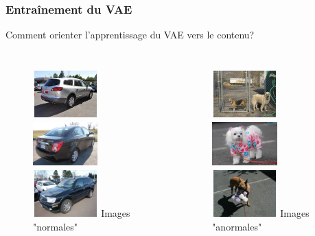 \documentclass{beamer}
\begin{document}
	\begin{frame}
		\frametitle{Entraînement du VAE}
		
		Comment orienter l'apprentissage du VAE vers le contenu?
		
		\begin{columns}
			\centering
			\begin{figure}
				\includegraphics[width=2.5cm,height=1.8cm]{../rapports/images/images_anomalies/inlier-1}
				\includegraphics[width=2.5cm,height=1.8cm]{../rapports/images/images_anomalies/inlier-2}
				\includegraphics[width=2.5cm,height=1.8cm]{../rapports/images/images_anomalies/inlier-3}
				{\footnotesize Images "normales"}
			\end{figure}
		
			\centering
			\begin{figure}
			\includegraphics[width=2.5cm,height=1.8cm]{../rapports/images/images_anomalies/anomalie-1}
			\includegraphics[width=2.5cm,height=1.8cm]{../rapports/images/images_anomalies/anomalie-2}
			\includegraphics[width=2.5cm,height=1.8cm]{../rapports/images/images_anomalies/anomalie-3}
			{\footnotesize Images "anormales"}
			\end{figure}
		

\end{columns}
\end{frame}
\end{document}
